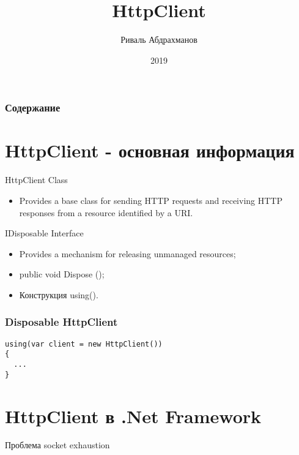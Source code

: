 \documentclass{beamer}
\title{HttpClient}
\author{Риваль Абдрахманов}
\date{2019}
\begin{document}
\begin{frame}
\titlepage
\end{frame}

\begin{frame}
\frametitle{Содержание}
\tableofcontents
\end{frame}

\section{HttpClient - основная информация}
\begin{frame}{HttpClient Class}
    \begin{itemize}
        \item Provides a base class for sending HTTP requests and receiving HTTP responses from a resource identified by a URI.
    \end{itemize}
\end{frame}

\begin{frame}{IDisposable Interface}
    \begin{itemize}
        \item Provides a mechanism for releasing unmanaged resources;
        \item public void Dispose ();
        \item Конструкция using().
    \end{itemize}
\end{frame}

\begin{frame}[fragile]
\frametitle{Disposable HttpClient}
\begin{lstlisting}
using(var client = new HttpClient())
{
  ...
}
\end{lstlisting}
\end{frame}

\section{HttpClient в .Net Framework}
\begin{frame}{Проблема socket exhaustion}
\end{frame}
\end{document}

